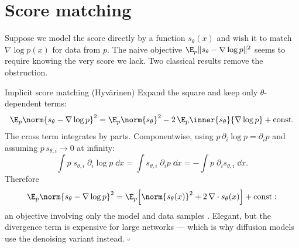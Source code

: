 \section{Score matching}\label{sec:score-matching}

Suppose we model the score directly by a function $s_\theta(x)$ and wish it
to match $\nabla \log p(x)$ for data from $p$. The naive objective
$\E_p \| s_\theta - \nabla \log p \|^2$ seems to require knowing the very
score we lack. Two classical results remove the obstruction.

\begin{toolbox}{Implicit score matching (Hyv\"arinen)}
Expand the square and keep only $\theta$-dependent terms:
\begin{equation*}
  \E_p \norm{s_\theta - \nabla \log p}^2
  = \E_p \norm{s_\theta}^2
  - 2\, \E_p \inner{s_\theta}{\nabla \log p}
  + \text{const}.
\end{equation*}
The cross term integrates by parts. Componentwise, using
$p\,\partial_i \log p = \partial_i p$ and assuming $p\, s_{\theta,i} \to 0$
at infinity:
\begin{equation*}
  \int p\; s_{\theta,i}\; \partial_i \log p \;\dd x
  = \int s_{\theta,i}\; \partial_i p \;\dd x
  = - \int p\; \partial_i s_{\theta,i} \;\dd x .
\end{equation*}
Therefore
\begin{equation*}
  \E_p \norm{s_\theta - \nabla \log p}^2
  = \E_p\Big[ \norm{s_\theta(x)}^2
    + 2\, \nabla \cdot s_\theta(x) \Big] + \text{const} :
\end{equation*}
an objective involving only the model and data samples
\citep{hyvarinen2005estimation}. Elegant, but the divergence term is
expensive for large networks --- which is why diffusion models use the
denoising variant instead. \hfill$\square$
\end{toolbox}

